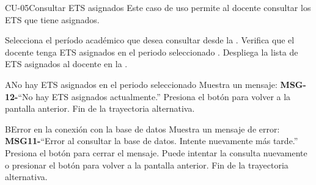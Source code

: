 

\begin{UseCase}{CU-05}{Consultar ETS asignados}{
		Este caso de uso permite al docente consultar los ETS que tiene asignados.
	}
\end{UseCase}
\begin{UCtrayectoria}
	\UCpaso[\UCactor] Selecciona el período académico que desea consultar desde la .
	\UCpaso Verifica que el docente tenga ETS asignados en el periodo seleccionado .
	\UCpaso Despliega la lista de ETS asignados al docente en la .
\end{UCtrayectoria}

\begin{UCtrayectoriaA}{A}{No hay ETS asignados en el periodo seleccionado}
	\UCpaso Muestra un mensaje: {\bf MSG-12-}{``No hay ETS asignados actualmente.''}
	\UCpaso[\UCactor] Presiona el botón  para volver a la pantalla anterior.
	\UCpaso Fin de la trayectoria alternativa.
\end{UCtrayectoriaA}
\begin{UCtrayectoriaA}{B}{Error en la conexión con la base de datos}
	\UCpaso Muestra un mensaje de error: {\bf MSG11-}{``Error al consultar la base de datos. Intente nuevamente más tarde.''}
	\UCpaso[\UCactor] Presiona el botón  para cerrar el mensaje.
	\UCpaso[\UCactor] Puede intentar la consulta nuevamente o presionar el botón  para volver a la pantalla anterior.
	\UCpaso Fin de la trayectoria alternativa.
\end{UCtrayectoriaA}

